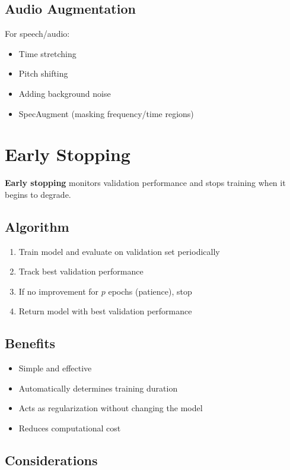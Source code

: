 \subsection{Audio Augmentation}

For speech/audio:
\begin{itemize}
    \item Time stretching
    \item Pitch shifting
    \item Adding background noise
    \item SpecAugment (masking frequency/time regions)
\end{itemize}

\section{Early Stopping}
\label{sec:early-stopping}

\textbf{Early stopping} monitors validation performance and stops training when it begins to degrade.

\subsection{Algorithm}

\begin{enumerate}
    \item Train model and evaluate on validation set periodically
    \item Track best validation performance
    \item If no improvement for $p$ epochs (patience), stop
    \item Return model with best validation performance
\end{enumerate}

\subsection{Benefits}

\begin{itemize}
    \item Simple and effective
    \item Automatically determines training duration
    \item Acts as regularization without changing the model
    \item Reduces computational cost
\end{itemize}

\subsection{Considerations}

